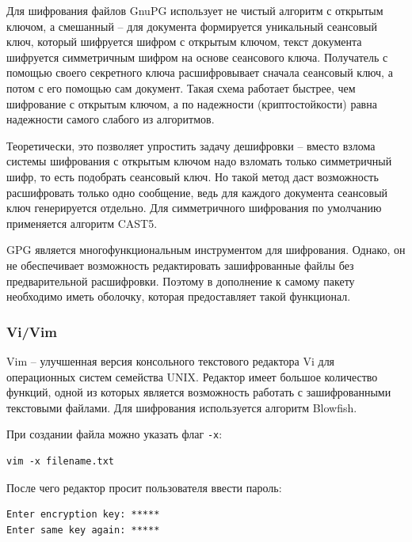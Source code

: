 Для шифрования файлов GnuPG использует не чистый алгоритм с открытым
ключом, а смешанный -- для документа формируется уникальный сеансовый ключ,
который шифруется шифром с открытым ключом, текст документа шифруется
симметричным шифром на основе сеансового ключа. Получатель с помощью своего
секретного ключа расшифровывает сначала сеансовый ключ, а потом с его помощью
сам документ. Такая схема работает быстрее, чем шифрование с открытым ключом,
а по надежности (криптостойкости) равна надежности самого слабого
из алгоритмов.

Теоретически, это позволяет упростить задачу дешифровки -- вместо взлома
системы шифрования с открытым ключом надо взломать только симметричный шифр,
то есть подобрать сеансовый ключ. Но такой метод даст возможность расшифровать
только одно сообщение, ведь для каждого документа сеансовый ключ генерируется
отдельно. Для симметричного шифрования по умолчанию применяется алгоритм CAST5.

GPG является многофункциональным инструментом для шифрования.
Однако, он не обеспечивает возможность редактировать зашифрованные файлы без предварительной
расшифровки. Поэтому в дополнение к самому пакету необходимо иметь
оболочку, которая предоставляет такой функционал.

\subsubsection{Vi/Vim}


Vim -- улучшенная версия консольного текстового редактора Vi для
операционных систем семейства UNIX. Редактор имеет большое количество функций,
одной из которых является возможность работать с зашифрованными
текстовыми файлами. Для шифрования используется алгоритм Blowfish.

При создании файла можно указать флаг \texttt{-x}:

\begin{verbatim}
vim -x filename.txt
\end{verbatim}

После чего редактор просит пользователя ввести пароль:
\begin{verbatim}
Enter encryption key: *****
Enter same key again: *****
\end{verbatim}

